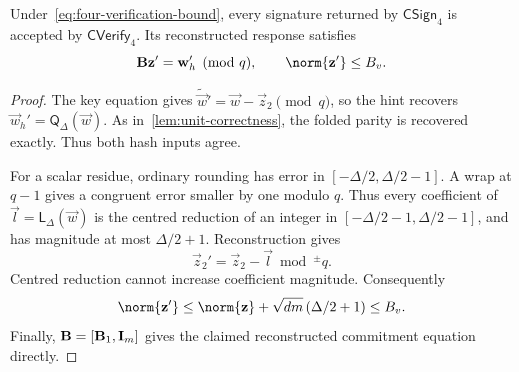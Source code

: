 \begin{lemma}
\label{lem:four-compressed}
Under~\cref{eq:four-verification-bound}, every signature returned by $\mathsf{CSign}_4$ is accepted by $\mathsf{CVerify}_4$. Its reconstructed response satisfies
\[
 \mat B\vec z'=\vec w_h'\pmod q,\qquad
 \norm{\vec z'}\le B_v.
\]
\end{lemma}
\begin{proof}
The key equation gives $\widetilde{\vec w}'=\vec w-\vec z_2\pmod q$, so the hint recovers $\vec w_h'=\mathsf{Q}_\Delta(\vec w)$. As in~\cref{lem:unit-correctness}, the folded parity is recovered exactly. Thus both hash inputs agree.

For a scalar residue, ordinary rounding has error in $[-\Delta/2,\Delta/2-1]$. A wrap at $q-1$ gives a congruent error smaller by one modulo $q$. Thus every coefficient of $\vec l=\mathsf{L}_\Delta(\vec w)$ is the centred reduction of an integer in $[-\Delta/2-1,\Delta/2-1]$, and has magnitude at most $\Delta/2+1$. Reconstruction gives
\[
 \vec z_2'=\vec z_2-\vec l\bmod^{\pm}q.
\]
Centred reduction cannot increase coefficient magnitude. Consequently
\[
 \norm{\vec z'}\le\norm{\vec z}+\sqrt{dm}\,(\Delta/2+1)\le B_v.
\]
Finally, $\mathbf{B}=[\mathbf{B}_1,\mathbf{I}_m]$ gives the claimed reconstructed commitment equation directly.
\end{proof}

\FloatBarrier
